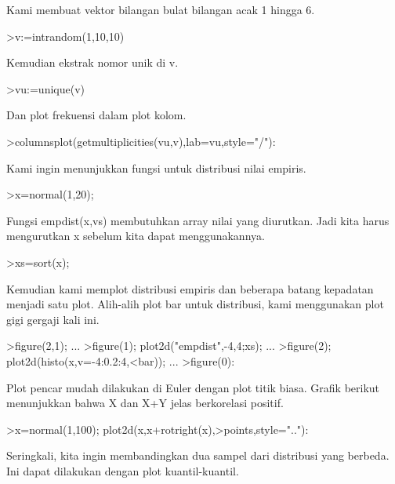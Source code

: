 \documentclass{article}
\begin{document}
\begin{eulernotebook}
\begin{eulercomment}
\begin{eulercomment}
\begin{eulercomment}
Kami membuat vektor bilangan bulat bilangan acak 1 hingga 6.
\end{eulercomment}
\begin{eulerprompt}
>v:=intrandom(1,10,10)
\end{eulerprompt}
\begin{euleroutput}
  [8,  5,  8,  8,  6,  8,  8,  3,  5,  5]
\end{euleroutput}
\begin{eulercomment}
Kemudian ekstrak nomor unik di v.
\end{eulercomment}
\begin{eulerprompt}
>vu:=unique(v)
\end{eulerprompt}
\begin{euleroutput}
  [3,  5,  6,  8]
\end{euleroutput}
\begin{eulercomment}
Dan plot frekuensi dalam plot kolom.
\end{eulercomment}
\begin{eulerprompt}
>columnsplot(getmultiplicities(vu,v),lab=vu,style="/"):
\end{eulerprompt}
\begin{eulercomment}
Kami ingin menunjukkan fungsi untuk distribusi nilai empiris.
\end{eulercomment}
\begin{eulerprompt}
>x=normal(1,20);
\end{eulerprompt}
\begin{eulercomment}
Fungsi empdist(x,vs) membutuhkan array nilai yang diurutkan. Jadi kita
harus mengurutkan x sebelum kita dapat menggunakannya.
\end{eulercomment}
\begin{eulerprompt}
>xs=sort(x);
\end{eulerprompt}
\begin{eulercomment}
Kemudian kami memplot distribusi empiris dan beberapa batang kepadatan
menjadi satu plot. Alih-alih plot bar untuk distribusi, kami
menggunakan plot gigi gergaji kali ini.
\end{eulercomment}
\begin{eulerprompt}
>figure(2,1); ...
>figure(1); plot2d("empdist",-4,4;xs); ...
>figure(2); plot2d(histo(x,v=-4:0.2:4,<bar));  ...
>figure(0):
\end{eulerprompt}
\begin{eulercomment}
Plot pencar mudah dilakukan di Euler dengan plot titik biasa. Grafik
berikut menunjukkan bahwa X dan X+Y jelas berkorelasi positif.
\end{eulercomment}
\begin{eulerprompt}
>x=normal(1,100); plot2d(x,x+rotright(x),>points,style=".."):
\end{eulerprompt}
\begin{eulercomment}
Seringkali, kita ingin membandingkan dua sampel dari distribusi yang
berbeda. Ini dapat dilakukan dengan plot kuantil-kuantil.


\end{eulercomment}
\end{eulercomment}
\end{eulercomment}
\end{eulernotebook}
\end{document}
